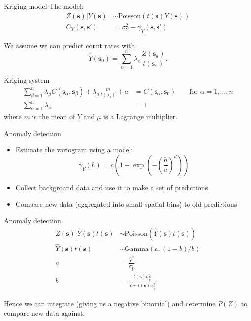 \documentclass[ignorenonframetext]{beamer}
\begin{document}
\begin{frame}{Kriging model}
  The model:
  \begin{align}
    Z(\mathbf{s}) | Y(\mathbf{s}) &\sim \text{Poisson}(t(\mathbf{s})
    Y(\mathbf{s}))\\
    C_Y(\mathbf{s}, \mathbf{s'}) &= \sigma_Y^2 - \gamma_Y (\mathbf{s},
    \mathbf{s'})
  \end{align}

  We assume we can predict count rates with
  \begin{equation}
    \hat{Y}(\mathbf{s}_0) = \sum_{\alpha=1}^n \lambda_\alpha
    \frac{Z(\mathbf{s}_\alpha)}{t(\mathbf{s}_\alpha)}.
  \end{equation}
\end{frame}

\begin{frame}{Kriging system}
  \begin{align}
    \sum_{\beta=1}^n \lambda_\beta C(\mathbf{s}_\alpha, \mathbf{s}_\beta) +
    \lambda_\alpha \frac{m}{t(\mathbf{s}_\alpha)} + \mu &= C(\mathbf{s}_\alpha,
    \mathbf{s}_0)\qquad \text{for } \alpha = 1, \ldots, n\\
    \sum_{\alpha=1}^n \lambda_\alpha &= 1
  \end{align}
  where \(m\) is the mean of \(Y\) and \(\mu\) is a Lagrange multiplier.
\end{frame}

\begin{frame}{Anomaly detection}
  \begin{itemize}
    \item Estimate the variogram using a model:
      \begin{equation}
        \gamma_Y(h) = c\left(1 - \exp \left(- \left(\frac{h}{a}\right)^d \right)\right)
      \end{equation}
    \item Collect background data and use it to make a set of predictions
    \item Compare new data (aggregated into small spatial bins) to old predictions
  \end{itemize}
\end{frame}

\begin{frame}{Anomaly detection}
  \begin{align}
    Z(\mathbf{s}) | \hat Y(\mathbf{s}) t(\mathbf{s}) &\sim \text{Poisson}(\hat Y(\mathbf{s})
    t(\mathbf{s}))\\
    \hat Y(\mathbf{s}) t(\mathbf{s}) &\sim \text{Gamma}(a, (1-b)/b)\\
    a &= \frac{\hat Y^2}{\sigma_{\hat Y}^2}\\
    b &= \frac{t(\mathbf{s}) \sigma_{\hat Y}^2}{\hat Y + t(\mathbf{s}) \sigma_{\hat Y}^2}
  \end{align}

  Hence we can integrate (giving us a negative binomial) and determine \(P(Z)\)
  to compare new data against.
\end{frame}
\end{document}
